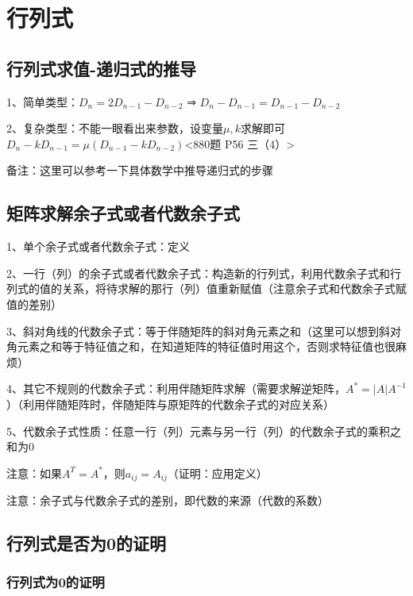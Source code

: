 \chapter{行列式}

\section{行列式求值-递归式的推导}

1、简单类型：$D_{n}=2D_{n-1}-D_{n-2}$ ⇒ $D_{n}-D_{n-1} = D_{n-1}-D_{n-2}$

2、复杂类型：不能一眼看出来参数，设变量$\mu ,k$求解即可$D_{n}-kD_{n-1} = \mu (D_{n-1}-kD_{n-2})$<880题 P56 三（4）>

备注：这里可以参考一下具体数学中推导递归式的步骤

\section{矩阵求解余子式或者代数余子式}

1、单个余子式或者代数余子式：定义

2、一行（列）的余子式或者代数余子式：构造新的行列式，利用代数余子式和行列式的值的关系，将待求解的那行（列）值重新赋值（注意余子式和代数余子式赋值的差别）

3、斜对角线的代数余子式：等于伴随矩阵的斜对角元素之和（这里可以想到斜对角元素之和等于特征值之和，在知道矩阵的特征值时用这个，否则求特征值也很麻烦）

4、其它不规则的代数余子式：利用伴随矩阵求解（需要求解逆矩阵，$A^*=|A|A^{-1}$）（利用伴随矩阵时，伴随矩阵与原矩阵的代数余子式的对应关系）

5、代数余子式性质：任意一行（列）元素与另一行（列）的代数余子式的乘积之和为0

注意：如果$A^T=A^*$，则$a_{ij}=A_{ij}$（证明：应用定义）

注意：余子式与代数余子式的差别，即代数的来源（代数的系数）

\section{行列式是否为0的证明}



\subsection{行列式为0的证明}

